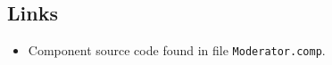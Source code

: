 \subsection*{Links}
\begin{itemize}
  \item Component source code found in file \texttt{Moderator.comp}.
\end{itemize}
